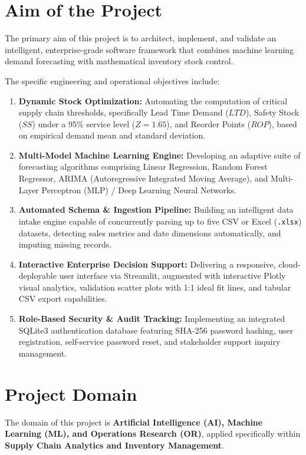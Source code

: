 \documentclass[12pt,a4paper]{report}
\begin{document}
\section{Aim of the Project}
The primary aim of this project is to architect, implement, and validate an intelligent, enterprise-grade software framework that combines machine learning demand forecasting with mathematical inventory stock control.

The specific engineering and operational objectives include:
\begin{enumerate}
    \item \textbf{Dynamic Stock Optimization:} Automating the computation of critical supply chain thresholds, specifically Lead Time Demand ($LTD$), Safety Stock ($SS$) under a 95\% service level ($Z = 1.65$), and Reorder Points ($ROP$), based on empirical demand mean and standard deviation.
    \item \textbf{Multi-Model Machine Learning Engine:} Developing an adaptive suite of forecasting algorithms comprising Linear Regression, Random Forest Regressor, ARIMA (Autoregressive Integrated Moving Average), and Multi-Layer Perceptron (MLP) / Deep Learning Neural Networks.
    \item \textbf{Automated Schema \& Ingestion Pipeline:} Building an intelligent data intake engine capable of concurrently parsing up to five CSV or Excel (\texttt{.xlsx}) datasets, detecting sales metrics and date dimensions automatically, and imputing missing records.
    \item \textbf{Interactive Enterprise Decision Support:} Delivering a responsive, cloud-deployable user interface via Streamlit, augmented with interactive Plotly visual analytics, validation scatter plots with 1:1 ideal fit lines, and tabular CSV export capabilities.
    \item \textbf{Role-Based Security \& Audit Tracking:} Implementing an integrated SQLite3 authentication database featuring SHA-256 password hashing, user registration, self-service password reset, and stakeholder support inquiry management.
\end{enumerate}

\section{Project Domain}
The domain of this project is \textbf{Artificial Intelligence (AI), Machine Learning (ML), and Operations Research (OR)}, applied specifically within \textbf{Supply Chain Analytics and Inventory Management}.
\end{document}

